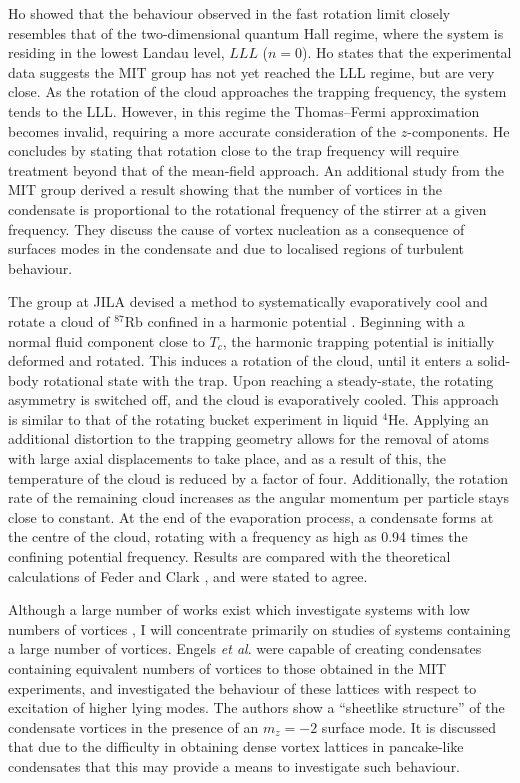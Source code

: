 Ho \cite{Vtx:Ho_prl_2001} showed that the behaviour observed in the fast rotation limit closely resembles that of the two-dimensional quantum Hall regime, where the system is residing in the lowest Landau level, $LLL$ ($n=0$). Ho states that the experimental data suggests the MIT group has not yet reached the LLL regime, but are very close. As the rotation of the cloud approaches the trapping frequency, the system tends to the LLL. However, in this regime the Thomas--Fermi approximation becomes invalid, requiring a more accurate consideration of the $z$-components. He concludes by stating that rotation close to the trap frequency will require treatment beyond that of the mean-field approach. An additional study from the MIT group \cite{Vtx:Raman_prl_2001} derived a result showing that the number of vortices in the condensate is proportional to the rotational frequency of the stirrer at a given frequency. They discuss the cause of vortex nucleation as a consequence of surfaces modes in the condensate and due to localised regions of turbulent behaviour.

The group at JILA devised a method to systematically evaporatively cool and rotate a cloud of $^{87}$Rb confined in a harmonic potential \cite{Vtx:Haljan_prl_2001}. Beginning with a normal fluid component close to $T_c$, the harmonic trapping potential is initially deformed and rotated. This induces a rotation of the cloud, until it enters a solid-body rotational state with the trap. Upon
reaching a steady-state, the rotating asymmetry is switched off, and the cloud is evaporatively cooled. This approach is similar to that of the rotating bucket experiment in liquid $^4$He. Applying an additional distortion to the trapping geometry allows for the removal of atoms with large axial displacements to take place, and as a result of this, the temperature of the cloud is reduced by a factor of four. Additionally, the rotation rate of the remaining cloud increases as the angular momentum per particle stays close to constant. At the end of the evaporation process, a condensate forms at the centre of the cloud, rotating with a frequency as high as 0.94 times the confining potential frequency. Results are compared with the theoretical calculations of Feder and Clark \cite{Vtx:Feder_prl_2001}, and were stated to agree.

Although a large number of works exist which investigate systems with low numbers of vortices \cite{THS:Davies_2000,Vtx:Chevy_prl_2000,Vtx:Cooper_prl_2001,Vtx:Rosenbusch_prl_2002,Vtx:Ogawa_pra_2002,Vtx:Bretin_joptb_2003}, I will concentrate primarily on studies of systems containing a large number of vortices. Engels \textit{et al}. \cite{Vtx:Engels_prl_2002} were capable of creating condensates containing equivalent numbers of vortices to those obtained in the MIT experiments, and investigated the behaviour of these lattices with respect to excitation of higher lying modes. The authors show a ``sheetlike structure'' of the condensate vortices in the presence of an $m_z=-2$ surface mode. It is discussed that due to the difficulty in obtaining dense vortex lattices in pancake-like condensates that this may provide a means to investigate such behaviour.

